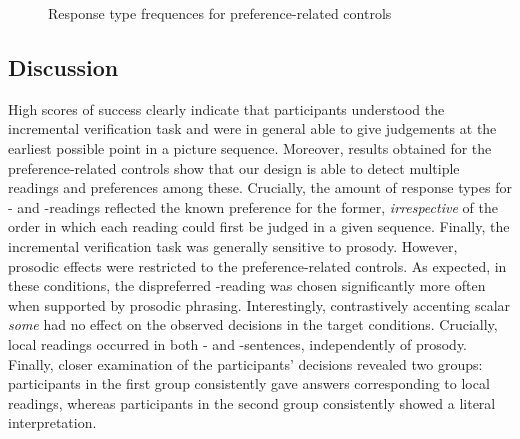 \documentclass[fleqn,reqno,10pt,draft]{article}
\newcommand{\as}{\acro{as}}
\renewcommand{\es}{\acro{es}}
\newcommand{\lc}{\acro{lc}}
\newcommand{\ec}{\acro{ec}}
\begin{document}
\begin{figure}[t]
{
}
  \caption{Response type frequences for preference-related controls}
  \label{fig:response-type-freque-TRF}
\end{figure}


\subsection{Discussion}
\label{sec:interpretation}


High scores of success clearly indicate that participants understood 
the incremental verification task and were in general able to give 
judgements at the earliest possible point in a picture sequence. 
Moreover, results obtained for the preference-related controls  
show that our design is able to detect multiple readings and preferences 
among these. Crucially, the amount of response types for \lc- and \ec-readings 
reflected the known preference for the former, \emph{irrespective} of the 
order in which each reading could first be judged in a given sequence.
Finally, the incremental verification task was generally sensitive
to prosody. However, prosodic effects were restricted to the preference-related 
controls. As expected, in these conditions, the dispreferred \ec-reading was chosen 
significantly more often when supported by prosodic phrasing. Interestingly, 
contrastively accenting scalar \emph{some} had no effect on the observed 
decisions in the target conditions. Crucially, local readings occurred in both
\as- and \es-sentences, independently of prosody. Finally, closer examination of 
the participants' decisions revealed two groups: participants in the first
group consistently gave answers corresponding to local readings, whereas participants
in the second group consistently showed a literal interpretation.  
\end{document}
